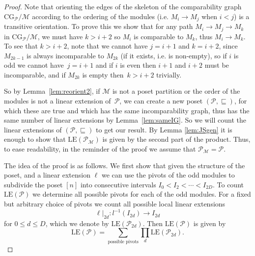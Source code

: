 \documentclass[9pt,a4paper,oneside]{article}
\newcommand{\cM}{\mathcal{M}}
\newcommand{\cP}{\mathcal{P}}
\newcommand{\CG}{\mathrm{CG}}
\newcommand{\lex}{\mathrm{LE}}
\begin{document}
\begin{proof}
Note that orienting the edges of the skeleton of the comparability graph $\CG_\cP/\cM$ according to the ordering of the modules
(i.e. $M_i\rightarrow M_j$ when $i<j$) is a transitive orientation.
To prove this we show that for any path $M_i\rightarrow M_j\rightarrow M_k$ in $\CG_\cP/\cM$, we must have $k>i+2$ so $M_i$ is comparable to $M_k$, thus $M_i\rightarrow M_k$.
To see that $k>i+2$, note that we cannot have $j=i+1$ and $k=i+2$, since $M_{2k-1}$ is always incomparable to $M_{2k}$ (if it exists, i.e. is non-empty), 
so if $i$ is odd we cannot have~$j=i+1$ and if $i$ is even then $i+1$ and $i+2$ must be incomparable, and if $M_{2k}$ is empty then~$k>i+2$ trivially.

So by Lemma~\ref{lem:reorient2}, if $\cM$ is not a poset partition or the order of the modules is not a linear extension of~$\cP$, we can create a new poset $(\cP,\sqsubseteq)$, 
for which these are true
and which has the same incomparability graph, thus has the same number of linear extensions by Lemma~\ref{lem:sameIG}. So we will count the linear extensions of $(\cP,\sqsubseteq)$ to get our result.
By Lemma \ref{lem:JSgen} it is enough to show that $\lex(\cP_{\cM})$  is given by the second part of the product. 
Thus,  to ease readability,  in the reminder of the proof we assume that $\cP_{\cM}=\cP$.

The idea of the proof is as follows.  
We first show that given the structure of the poset,  and a linear extension $\ell$ we can use the pivots of the odd modules to subdivide the poset $[n]$ into consecutive intervals $I_0<I_2<\cdots<I_{2D}$. 
To count $\lex(\cP)$ we determine all possible pivots for each of the odd modules.  For a fixed but arbitrary choice of pivots we count all possible local linear extensions 
\[\ell|_{2d}:l^{-1}(I_{2d}) \to I_{2d}\]
for $0\leq d \leq D$,  which we denote by $\lex({\cP_{2d}})$.
Then $\lex(\cP)$ is given by 
\[\lex(\cP)=\sum_{\text{possible pivots}} \prod_{d} \lex({\cP_{2d}}).\]




\end{proof}
\end{document}
